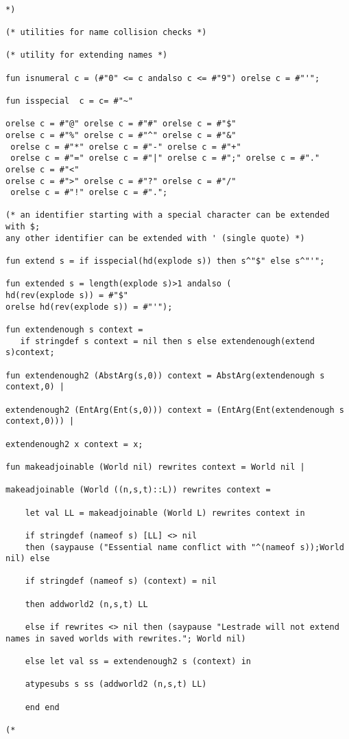 \documentclass{article}
\begin{document}
\begin{verbatim}

*)

(* utilities for name collision checks *)

(* utility for extending names *)

fun isnumeral c = (#"0" <= c andalso c <= #"9") orelse c = #"'";

fun isspecial  c = c= #"~" 

orelse c = #"@" orelse c = #"#" orelse c = #"$" 
orelse c = #"%" orelse c = #"^" orelse c = #"&"
 orelse c = #"*" orelse c = #"-" orelse c = #"+"
 orelse c = #"=" orelse c = #"|" orelse c = #";" orelse c = #"." orelse c = #"<" 
orelse c = #">" orelse c = #"?" orelse c = #"/"
 orelse c = #"!" orelse c = #".";

(* an identifier starting with a special character can be extended with $;
any other identifier can be extended with ' (single quote) *)

fun extend s = if isspecial(hd(explode s)) then s^"$" else s^"'";

fun extended s = length(explode s)>1 andalso (
hd(rev(explode s)) = #"$"
orelse hd(rev(explode s)) = #"'");
 
fun extendenough s context = 
   if stringdef s context = nil then s else extendenough(extend s)context;

fun extendenough2 (AbstArg(s,0)) context = AbstArg(extendenough s context,0) |

extendenough2 (EntArg(Ent(s,0))) context = (EntArg(Ent(extendenough s context,0))) |

extendenough2 x context = x;

fun makeadjoinable (World nil) rewrites context = World nil |

makeadjoinable (World ((n,s,t)::L)) rewrites context =

    let val LL = makeadjoinable (World L) rewrites context in

    if stringdef (nameof s) [LL] <> nil
    then (saypause ("Essential name conflict with "^(nameof s));World nil) else

    if stringdef (nameof s) (context) = nil 

    then addworld2 (n,s,t) LL

    else if rewrites <> nil then (saypause "Lestrade will not extend names in saved worlds with rewrites."; World nil)

    else let val ss = extendenough2 s (context) in

    atypesubs s ss (addworld2 (n,s,t) LL)
    
    end end

(*

\end{verbatim}
\end{document}
